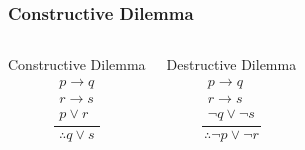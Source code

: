 \documentclass[dvipsnames]{beamer}
\begin{document}



\begin{frame}
  \frametitle{Constructive Dilemma}

  \begin{columns}[t]
    \begin{block}{Constructive Dilemma}
      \[
      \frac
        {
          \begin{array}{c}
            p \rightarrow q\\
            r \rightarrow s\\
            p \vee r
          \end{array}}
        {
          \therefore q \vee s
        }
      \]
    \end{block}

    \pause
    \begin{block}{Destructive Dilemma}
      \[
      \frac
        {
          \begin{array}{c}
            p \rightarrow q\\
            r \rightarrow s\\
            \neg q \vee \neg s
          \end{array}
          }
          {
            \therefore \neg p \vee \neg r
          }
      \]
    \end{block}
  \end{columns}
\end{frame}
\end{document}
